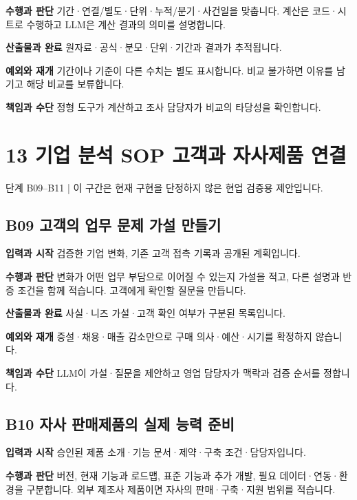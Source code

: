 \documentclass[a4paper,10pt]{article}
\begin{document}
\noindent\textbf{수행과 판단} 기간·연결/별도·단위·누적/분기·사건일을 맞춥니다. 계산은 코드·시트로 수행하고 LLM은 계산 결과의 의미를 설명합니다.


\noindent\textbf{산출물과 완료} 원자료·공식·분모·단위·기간과 결과가 추적됩니다.


\noindent\textbf{예외와 재개} 기간이나 기준이 다른 수치는 별도 표시합니다. 비교 불가하면 이유를 남기고 해당 비교를 보류합니다.


\noindent\textbf{책임과 수단} 정형 도구가 계산하고 조사 담당자가 비교의 타당성을 확인합니다.


\endgroup
\clearpage
\section*{13 기업 분석 SOP 고객과 자사제품 연결}
단계 B09–B11  |  이 구간은 현재 구현을 단정하지 않은 현업 검증용 제안입니다.


\begingroup\setlength{\parskip}{3pt}
\subsection*{B09 고객의 업무 문제 가설 만들기}
\noindent\textbf{입력과 시작} 검증한 기업 변화, 기존 고객 접촉 기록과 공개된 계획입니다.


\noindent\textbf{수행과 판단} 변화가 어떤 업무 부담으로 이어질 수 있는지 가설을 적고, 다른 설명과 반증 조건을 함께 적습니다. 고객에게 확인할 질문을 만듭니다.


\noindent\textbf{산출물과 완료} 사실·니즈 가설·고객 확인 여부가 구분된 목록입니다.


\noindent\textbf{예외와 재개} 증설·채용·매출 감소만으로 구매 의사·예산·시기를 확정하지 않습니다.


\noindent\textbf{책임과 수단} LLM이 가설·질문을 제안하고 영업 담당자가 맥락과 검증 순서를 정합니다.


\endgroup
\begingroup\setlength{\parskip}{3pt}
\subsection*{B10 자사 판매제품의 실제 능력 준비}
\noindent\textbf{입력과 시작} 승인된 제품 소개·기능 문서·제약·구축 조건·담당자입니다.


\noindent\textbf{수행과 판단} 버전, 현재 기능과 로드맵, 표준 기능과 추가 개발, 필요 데이터·연동·환경을 구분합니다. 외부 제조사 제품이면 자사의 판매·구축·지원 범위를 적습니다.
\end{document}
